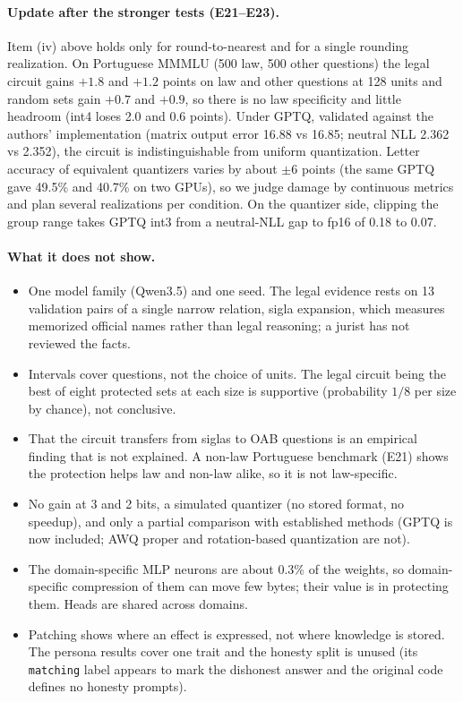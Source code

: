 \documentclass[11pt]{article}
\newcommand{\code}[1]{\texttt{#1}}
\begin{document}
\paragraph{Update after the stronger tests (E21--E23).}
Item (iv) above holds only for round-to-nearest and for a single rounding realization. On Portuguese MMMLU (500 law, 500 other questions) the legal circuit gains $+1.8$ and $+1.2$ points on law and other questions at 128 units and random sets gain $+0.7$ and $+0.9$, so there
is no law specificity and little headroom (int4 loses 2.0 and 0.6 points). Under GPTQ, validated against the authors' implementation (matrix output error 16.88 vs 16.85; neutral NLL 2.362 vs 2.352), the circuit is indistinguishable from uniform quantization. Letter accuracy of
equivalent quantizers varies by about $\pm6$ points (the same GPTQ gave 49.5\% and 40.7\% on two GPUs), so we judge damage by continuous metrics and plan several realizations per condition. On the quantizer side, clipping the group range takes GPTQ int3 from a neutral-NLL gap to fp16 of 0.18 to 0.07.

\paragraph{What it does not show.}
\begin{itemize}\setlength\itemsep{0pt}
\item One model family (Qwen3.5) and one seed. The legal evidence rests on 13 validation pairs of a single narrow relation, sigla expansion, which measures memorized official names rather than legal reasoning; a jurist has not reviewed the facts.
\item Intervals cover questions, not the choice of units. The legal circuit being the best of eight protected sets at each size is supportive (probability $1/8$ per size by chance), not conclusive.
\item That the circuit transfers from siglas to OAB questions is an empirical finding that is not explained. A non-law Portuguese benchmark (E21) shows the protection helps law and non-law alike, so it is not law-specific.
\item No gain at 3 and 2 bits, a simulated quantizer (no stored format, no speedup), and only a partial comparison with established methods (GPTQ is now included; AWQ proper and rotation-based quantization are not).
\item The domain-specific MLP neurons are about 0.3\% of the weights, so domain-specific compression of them can move few bytes; their value is in protecting them. Heads are shared across domains.
\item Patching shows where an effect is expressed, not where knowledge is stored. The persona results cover one trait and the honesty split is unused (its \code{matching} label appears to mark the dishonest answer and the original code defines no honesty prompts).
\end{itemize}
\end{document}
